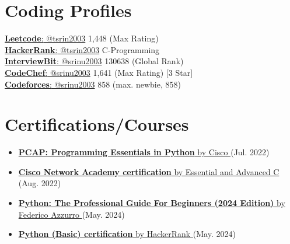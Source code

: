 \documentclass[a4paper,11pt]{article}
\newcommand{\resumeItem}[1]{
  \item\small{
    {#1 \vspace{-2pt}}
  }
}
\newcommand{\resumeItemListStart}{\begin{itemize}}
\newcommand{\resumeItemListEnd}{\end{itemize}\vspace{-5pt}}
\begin{document}
\vspace{-12pt}
\section{Coding Profiles}
\begin{multicols}{2}
  \begin{itemize}[leftmargin=0.15in, label={}]
    \small{\item{
      \href{https://leetcode.com/tsrin2003/}{\underline{\textbf{Leetcode}}{:} @tsrin2003} 1,448 (Max Rating) \\
      \href{https://www.hackerrank.com/tsrin2003}{\underline{\textbf{HackerRank}}{:} @tsrin2003} C-Programming \\
      \href{https://www.interviewbit.com/profile/srinu2003/}{\underline{\textbf{InterviewBit}}{:} @srinu2003} 130638 (Global Rank) \\
      \href{https://www.codechef.com/users/srinu2003}{\underline{\textbf{CodeChef}}{:} @srinu2003} 1,641 (Max Rating) [3 Star] \\
      \href{https://codeforces.com/profile/srinu2003}{\underline{\textbf{Codeforces}}{:} @srinu2003} 858 (max. newbie, 858) \\
      }
    }
  \end{itemize}
\end{multicols}

\vspace{-3pt}
  \section{Certifications/Courses}
    \resumeItemListStart[parsep = 0pt]
      \resumeItem{\href{https://drive.google.com/file/d/1ciuy0EC8fBujuxVOcZ--oUG9OZ8eHr5D/view?usp=drive_link}
                        {\textbf{PCAP: Programming Essentials in Python} by Cisco \faExternalLink*} (Jul. 2022)}
      \resumeItem{\href{https://drive.google.com/file/d/1w72XSRwblf5AqqEBGvnUbvUayJTcpWO-/view?usp=drive_link}
                        {\textbf{Cisco Network Academy certification} by Essential and Advanced C \faExternalLink*} (Aug. 2022)}
      \resumeItem{\href{https://www.udemy.com/certificate/UC-79138624-8361-423b-b131-42765a08db12/}
                        {\textbf{Python: The Professional Guide For Beginners (2024 Edition)} by \href{https://www.linkedin.com/in/federicoazzu/}{Federico Azzurro} \faExternalLink*} (May. 2024)}
      \resumeItem{\href{https://www.hackerrank.com/certificates/607a2d4d88f1}
                        {\textbf{Python (Basic) certification} by HackerRank \faExternalLink*} (May. 2024)}
    \resumeItemListEnd
\end{document}
